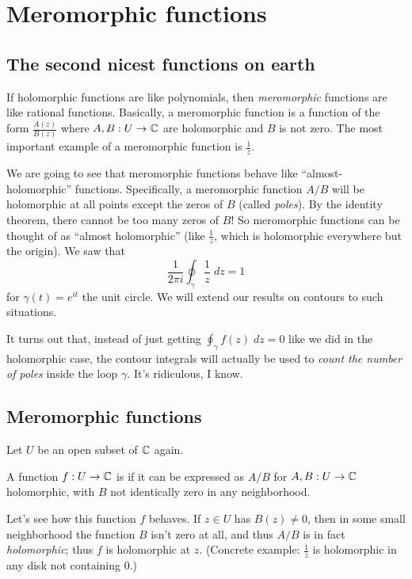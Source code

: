 \chapter{Meromorphic functions}
\section{The second nicest functions on earth}
If holomorphic functions are like polynomials,
then \emph{meromorphic} functions are like rational functions.
Basically, a meromorphic function is a function of the form
$ \frac{A(z)}{B(z)} $
where $A , B:  U \to \mathbb C$ are holomorphic and $B$ is not zero.
The most important example of a meromorphic function is $\frac 1z$.

We are going to see that meromorphic functions behave
like ``almost-holomorphic'' functions.
Specifically, a meromorphic function $A/B$ will be holomorphic at all points
except the zeros of $B$ (called \emph{poles}).
By the identity theorem, there cannot be too many zeros of $B$!
So meromorphic functions can be thought of as ``almost holomorphic''
(like $\frac 1z$, which is holomorphic everywhere but the origin).
We saw that
\[ \frac{1}{2\pi i} \oint_{\gamma} \frac 1z \; dz =  1 \]
for $\gamma(t) = e^{it}$ the unit circle.
We will extend our results on contours to such situations.

It turns out that, instead of just getting $\oint_\gamma f(z) \; dz = 0$
like we did in the holomorphic case,
the contour integrals will actually be used to
\emph{count the number of poles} inside the loop $\gamma$.
It's ridiculous, I know.

\section{Meromorphic functions}

Let $U$ be an open subset of $\mathbb C$ again.
\begin{definition}
	A function $f : U \to \mathbb C$ is  if it can be expressed as $A/B$
	for $A, B : U \to \mathbb C$ holomorphic, with $B$ not identically zero in any neighborhood.
\end{definition}
Let's see how this function $f$ behaves.
If $z \in U$ has $B(z) \neq 0$, then in some small neighborhood the function $B$ isn't zero
at all, and thus $A/B$ is in fact \emph{holomorphic}; thus $f$ is holomorphic at $z$.
(Concrete example: $\frac 1z$ is holomorphic in any disk not containing $0$.)

